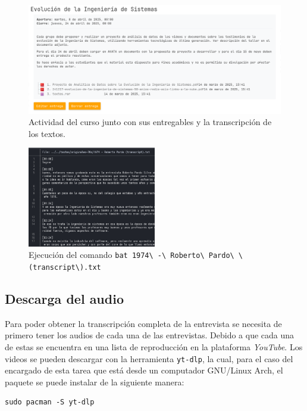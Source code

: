 \documentclass{article}
\begin{document}
\begin{figure}[ht]
  \centering
  \includegraphics[width=\textwidth]{img/img1.png}
  \caption{\label{fig:avata} Actividad del curso junto con sus entregables y la transcripción de los textos.}
\end{figure}


\begin{figure}[ht]
  \centering
  \includegraphics[width=0.5\textwidth]{img/img2.png}
  \caption{\label{fig:transcript} Ejecución del comando \lstinline[style=bashstyle]!bat 1974\ -\ Roberto\ Pardo\ \(transcript\).txt!  }
\end{figure}

\subsection{Descarga del audio}

Para poder obtener la transcripción completa de la entrevista se necesita de primero tener los audios de cada una de las entrevistas. Debido a que cada una de estas se encuentra en una lista de reproducción en la plataforma \textit{YouTube}\cite{youtube}. Los videos se pueden descargar con la herramienta \lstinline[style=bashstyle]!yt-dlp!, la cual, para el caso del encargado de esta tarea que está desde un computador GNU/Linux Arch, el paquete se puede instalar de la siguiente manera:

\begin{lstlisting}[style=bashstyle]
sudo pacman -S yt-dlp
\end{lstlisting}
\end{document}
